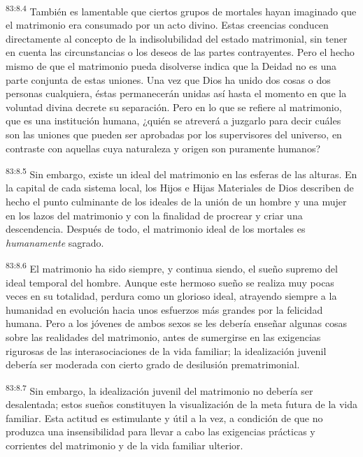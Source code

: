 \par
\textsuperscript{83:8.4} También es lamentable que ciertos grupos de mortales hayan imaginado que el matrimonio era consumado por un acto divino. Estas creencias conducen directamente al concepto de la indisolubilidad del estado matrimonial, sin tener en cuenta las circunstancias o los deseos de las partes contrayentes. Pero el hecho mismo de que el matrimonio pueda disolverse indica que la Deidad no es una parte conjunta de estas uniones. Una vez que Dios ha unido dos cosas o dos personas cualquiera, éstas permanecerán unidas así hasta el momento en que la voluntad divina decrete su separación. Pero en lo que se refiere al matrimonio, que es una institución humana, ¿quién se atreverá a juzgarlo para decir cuáles son las uniones que pueden ser aprobadas por los supervisores del universo, en contraste con aquellas cuya naturaleza y origen son puramente humanos?

\par
\textsuperscript{83:8.5} Sin embargo, existe un ideal del matrimonio en las esferas de las alturas. En la capital de cada sistema local, los Hijos e Hijas Materiales de Dios describen de hecho el punto culminante de los ideales de la unión de un hombre y una mujer en los lazos del matrimonio y con la finalidad de procrear y criar una descendencia. Después de todo, el matrimonio ideal de los mortales es \textit{humanamente} sagrado.

\par
\textsuperscript{83:8.6} El matrimonio ha sido siempre, y continua siendo, el sueño supremo del ideal temporal del hombre. Aunque este hermoso sueño se realiza muy pocas veces en su totalidad, perdura como un glorioso ideal, atrayendo siempre a la humanidad en evolución hacia unos esfuerzos más grandes por la felicidad humana. Pero a los jóvenes de ambos sexos se les debería enseñar algunas cosas sobre las realidades del matrimonio, antes de sumergirse en las exigencias rigurosas de las interasociaciones de la vida familiar; la idealización juvenil debería ser moderada con cierto grado de desilusión prematrimonial.

\par
\textsuperscript{83:8.7} Sin embargo, la idealización juvenil del matrimonio no debería ser desalentada; estos sueños constituyen la visualización de la meta futura de la vida familiar. Esta actitud es estimulante y útil a la vez, a condición de que no produzca una insensibilidad para llevar a cabo las exigencias prácticas y corrientes del matrimonio y de la vida familiar ulterior.

